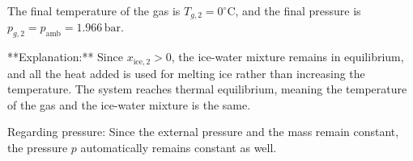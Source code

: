 The final temperature of the gas is \( T_{g,2} = 0^\circ\text{C} \), and the final pressure is \( p_{g,2} = p_{\text{amb}} = 1.966 \, \text{bar} \).  

**Explanation:**  
Since \( x_{\text{ice},2} > 0 \), the ice-water mixture remains in equilibrium, and all the heat added is used for melting ice rather than increasing the temperature. The system reaches thermal equilibrium, meaning the temperature of the gas and the ice-water mixture is the same.  

Regarding pressure: Since the external pressure and the mass remain constant, the pressure \( p \) automatically remains constant as well.